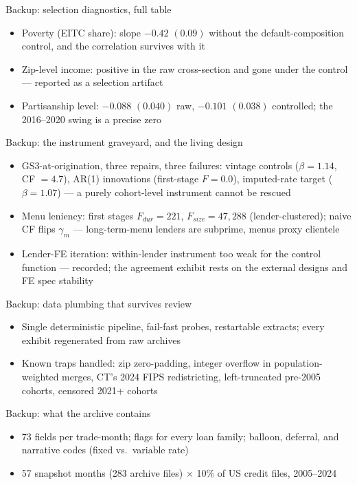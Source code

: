 \documentclass[11pt,aspectratio=169]{beamer}
\newenvironment{wideitemize}{\begin{itemize}\setlength{\itemsep}{0.7em}}{\end{itemize}}
\newcommand{\back}[2]{\hyperlink{#1}{\beamerreturnbutton{#2}}}
\newcommand{\buttonrow}[1]{\vspace{0.3em}\hfill #1}
\begin{document}
\begin{frame}[label=b_select]{Backup: selection diagnostics, full table}
\begin{wideitemize}
  \item Poverty (EITC share): slope $-0.42$ $(0.09)$ without the
        default-composition control, and the correlation survives with it
  \item Zip-level income: positive in the raw cross-section and gone
        under the control --- reported as a selection artifact
  \item Partisanship level: $-0.088$ $(0.040)$ raw, $-0.101$ $(0.038)$
        controlled; the 2016--2020 swing is a precise zero
\end{wideitemize}
\buttonrow{\back{threat_sel}{back: threat 3}}
\end{frame}

\begin{frame}[label=b_iv]{Backup: the instrument graveyard, and the living design}
\begin{wideitemize}
  \item GS3-at-origination, three repairs, three failures: vintage
        controls ($\beta = 1.14$, CF $= 4.7$), AR(1) innovations
        (first-stage $F = 0.0$), imputed-rate target ($\beta = 1.07$) ---
        a purely cohort-level instrument cannot be rescued
  \item Menu leniency: first stages $F_{dur} = 221$, $F_{size} = 47{,}288$
        (lender-clustered); naive CF flips $\gamma_m$ --- long-term-menu
        lenders are subprime, menus proxy clientele
  \item Lender-FE iteration: within-lender instrument too weak for the
        control function --- recorded; the agreement exhibit rests on the
        external designs and FE spec stability
\end{wideitemize}
\buttonrow{\back{threat_endog}{back: threat 2}}
\end{frame}

\begin{frame}{Backup: data plumbing that survives review}
\begin{wideitemize}
  \item Single deterministic pipeline, fail-fast probes, restartable
        extracts; every exhibit regenerated from raw archives
  \item Known traps handled: zip zero-padding, integer overflow in
        population-weighted merges, CT's 2024 FIPS redistricting,
        left-truncated pre-2005 cohorts, censored 2021+ cohorts
\end{wideitemize}
\end{frame}

\begin{frame}{Backup: what the archive contains}
\begin{wideitemize}
  \item 73 fields per trade-month; flags for every loan family; balloon,
        deferral, and narrative codes (fixed vs.\ variable rate)
  \item 57 snapshot months (283 archive files) $\times$ 10\% of US
        credit files, 2005--2024
\end{wideitemize}
\end{frame}
\end{document}
